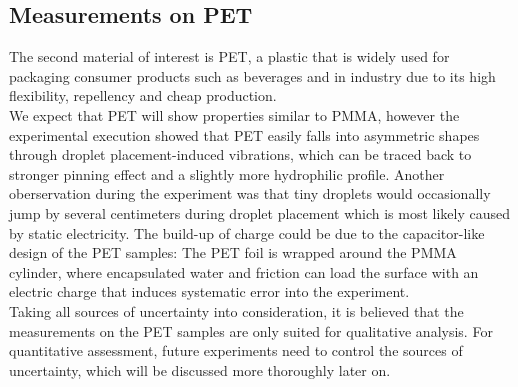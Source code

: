 \subsection{Measurements on PET}

    The second material of interest is PET, a plastic that is widely used for packaging consumer products such as beverages and in industry due to its high flexibility, repellency and cheap production. \\

    We expect that PET will show properties similar to PMMA, however the experimental execution showed that PET easily falls into asymmetric shapes through droplet placement-induced vibrations, which can be traced back to stronger pinning effect and a slightly more hydrophilic profile. Another oberservation during the experiment was that tiny droplets would occasionally jump by several centimeters during droplet placement which is most likely caused by static electricity. The build-up of charge could be due to the capacitor-like design of the PET samples: The PET foil is wrapped around the PMMA cylinder, where encapsulated water and friction can load the surface with an electric charge that induces systematic error into the experiment. \\

    Taking all sources of uncertainty into consideration, it is believed that the measurements on the PET samples are only suited for qualitative analysis. For quantitative assessment, future experiments need to control the sources of uncertainty, which will be discussed more thoroughly later on. \\

